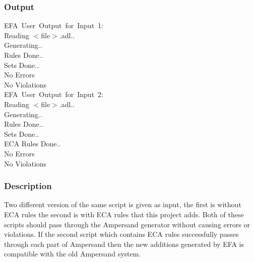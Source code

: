 \documentclass[12pt]{report}
\begin{document}
\vspace{-12pt}\subsubsection*{Output}
EFA\ User\ Output\ for\ Input\ 1: \\
	Reading $<$file$>$.adl.. \\
	Generating.. \\
	Rules Done.. \\
	Sets Done.. \\
	No Errors \\
	No Violations \\
	EFA\ User\ Output\ for\ Input\ 2: \\
	Reading $<$file$>$.adl..\\
	Generating.. \\
	Rules Done.. \\
	Sets Done.. \\
	ECA Rules Done.. \\
	No Errors \\
	No Violations \\
	
\vspace{-12pt}\subsubsection*{Description}
Two different version of the same script is given as input, the first is 
without ECA rules the second is with ECA rules that this project adds. Both of 
these scripts should pass through the Ampersand generator without causing 
errors or violations. If the second script which contains ECA rules 
successfully passes through each part of Ampersand then the new additions 
generated by EFA is compatible with the old Ampersand system.
\end{document}
